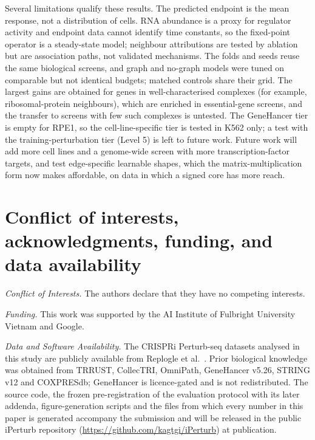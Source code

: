 Several limitations qualify these results. The predicted endpoint is the mean response, not a distribution of cells. RNA abundance is a proxy for regulator activity and endpoint data cannot identify time constants, so the fixed-point operator is a steady-state model; neighbour attributions are tested by ablation but are association paths, not validated mechanisms. The folds and seeds reuse the same biological screens, and graph and no-graph models were tuned on comparable but not identical budgets; matched controls share their grid. The largest gains are obtained for genes in well-characterised complexes (for example, ribosomal-protein neighbours), which are enriched in essential-gene screens, and the transfer to screens with few such complexes is untested. The GeneHancer tier is empty for RPE1, so the cell-line-specific tier is tested in K562 only; a test with the training-perturbation tier (Level 5) is left to future work. Future work will add more cell lines and a genome-wide screen with more transcription-factor targets, and test edge-specific learnable shapes, which the matrix-multiplication form now makes affordable, on data in which a signed core has more reach.

\section*{Conflict of interests, acknowledgments, funding, and data availability}
\textit{Conflict of Interests.} The authors declare that they have no competing interests.

\textit{Funding.} This work was supported by the AI Institute of Fulbright University Vietnam and Google.

\textit{Data and Software Availability.} The CRISPRi Perturb-seq datasets analysed in this study are publicly available from Replogle et al.~\cite{replogle2022mapping}. Prior biological knowledge was obtained from TRRUST, CollecTRI, OmniPath, GeneHancer v5.26, STRING v12 and COXPRESdb; GeneHancer is licence-gated and is not redistributed. The source code, the frozen pre-registration of the evaluation protocol with its later addenda, figure-generation scripts and the files from which every number in this paper is generated accompany the submission and will be released in the public iPerturb repository (\url{https://github.com/kagtgi/iPerturb}) at publication.
